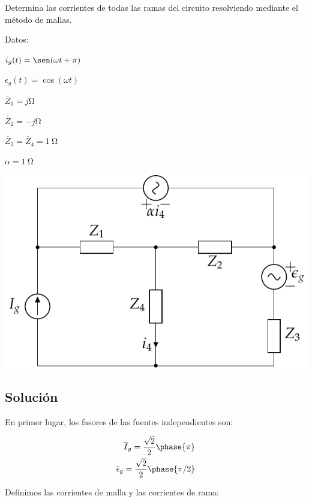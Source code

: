 \documentclass[12pt]{article}
\begin{document}
\begin{minipage}{0.5\textwidth}
  Determina las corrientes de todas las ramas del circuito resolviendo
  mediante el método de mallas.

  Datos:

  $i_g(t) = \sen(\omega t + \pi)$

  $\epsilon_g(t) = \cos(\omega t)$

  $\overline{Z}_1 = j\si{\ohm}$

  $\overline{Z}_2 = -j\si{\ohm}$

  $\overline{Z}_3 = \overline{Z}_4 = \SI{1}{\ohm}$

  $\alpha = \SI{1}{\ohm}$
\end{minipage}
\begin{minipage}{0.5\textwidth}
  \includegraphics[width=\textwidth]{figs/mallas.pdf}
\end{minipage}

\subsection*{Solución}

En primer lugar, los fasores de las fuentes independientes son:

\begin{align*}
  \overline{I}_g = \frac{\sqrt{2}}{2}\phase{\pi}\\
   \overline{\epsilon}_g = \frac{\sqrt{2}}{2}\phase{\pi/2}\\
\end{align*}

Definimos las corrientes de malla y las corrientes de rama:
\end{document}
